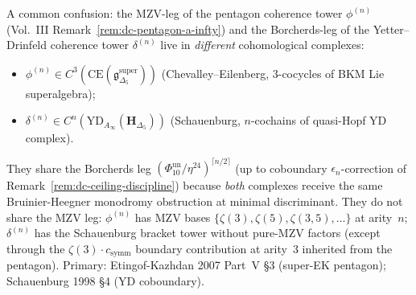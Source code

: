 \begin{remark}
\label{rem:dc-yd-vs-mzv-decoupling}
A common confusion: the MZV-leg of the pentagon coherence tower
$\phi^{(n)}$ (Vol.~III
Remark~\ref{rem:dc-pentagon-a-infty}) and the Borcherds-leg of
the Yetter--Drinfeld coherence tower $\delta^{(n)}$ live in
\emph{different} cohomological complexes:
\begin{itemize}
\item $\phi^{(n)} \in C^3(\mathrm{CE}(\mathfrak{g}_{\Delta_5}^{\mathrm{super}}))$
(Chevalley--Eilenberg, $3$-cocycles of BKM Lie superalgebra);
\item $\delta^{(n)} \in C^n(\mathrm{YD}_{A_\infty}(\mathbf{H}_{\Delta_5}))$
(Schauenburg, $n$-cochains of quasi-Hopf YD complex).
\end{itemize}
They share the Borcherds leg $(\Phi_{10}^{\mathrm{un}}/\eta^{24})^{\lceil n/2\rceil}$
(up to coboundary $\epsilon_n$-correction of
Remark~\ref{rem:dc-ceiling-discipline}) because \emph{both} complexes
receive the same Bruinier-Heegner monodromy obstruction at minimal
discriminant. They do not share the MZV leg: $\phi^{(n)}$ has MZV
bases $\{\zeta(3), \zeta(5), \zeta(3,5), \ldots\}$ at arity~$n$;
$\delta^{(n)}$ has the Schauenburg bracket tower without pure-MZV
factors (except through the $\zeta(3)\cdot c_{\mathrm{symm}}$
boundary contribution at arity~$3$ inherited from the pentagon).
Primary: Etingof-Kazhdan 2007 Part~V \S3 (super-EK pentagon);
Schauenburg 1998 \S4 (YD coboundary).
\end{remark}

